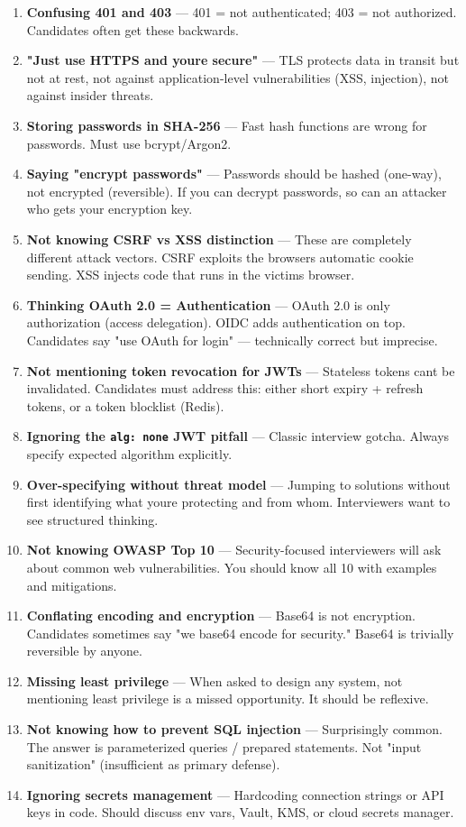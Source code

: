\documentclass[11pt]{article}
\begin{document}
\begin{enumerate}
\def\labelenumi{\arabic{enumi}.}
\item
  \textbf{Confusing 401 and 403} --- 401 = not authenticated; 403 = not authorized. Candidates often get these backwards.
\item
  \textbf{"Just use HTTPS and you\textquotesingle re secure"} --- TLS protects data in transit but not at rest, not against application-level vulnerabilities (XSS, injection), not against insider threats.
\item
  \textbf{Storing passwords in SHA-256} --- Fast hash functions are wrong for passwords. Must use bcrypt/Argon2.
\item
  \textbf{Saying "encrypt passwords"} --- Passwords should be hashed (one-way), not encrypted (reversible). If you can decrypt passwords, so can an attacker who gets your encryption key.
\item
  \textbf{Not knowing CSRF vs XSS distinction} --- These are completely different attack vectors. CSRF exploits the browser\textquotesingle s automatic cookie sending. XSS injects code that runs in the victim\textquotesingle s browser.
\item
  \textbf{Thinking OAuth 2.0 = Authentication} --- OAuth 2.0 is only authorization (access delegation). OIDC adds authentication on top. Candidates say "use OAuth for login" --- technically correct but imprecise.
\item
  \textbf{Not mentioning token revocation for JWTs} --- Stateless tokens can\textquotesingle t be invalidated. Candidates must address this: either short expiry + refresh tokens, or a token blocklist (Redis).
\item
  \textbf{Ignoring the \texttt{alg:\ none} JWT pitfall} --- Classic interview gotcha. Always specify expected algorithm explicitly.
\item
  \textbf{Over-specifying without threat model} --- Jumping to solutions without first identifying what you\textquotesingle re protecting and from whom. Interviewers want to see structured thinking.
\item
  \textbf{Not knowing OWASP Top 10} --- Security-focused interviewers will ask about common web vulnerabilities. You should know all 10 with examples and mitigations.
\item
  \textbf{Conflating encoding and encryption} --- Base64 is not encryption. Candidates sometimes say "we base64 encode for security." Base64 is trivially reversible by anyone.
\item
  \textbf{Missing least privilege} --- When asked to design any system, not mentioning least privilege is a missed opportunity. It should be reflexive.
\item
  \textbf{Not knowing how to prevent SQL injection} --- Surprisingly common. The answer is parameterized queries / prepared statements. Not "input sanitization" (insufficient as primary defense).
\item
  \textbf{Ignoring secrets management} --- Hardcoding connection strings or API keys in code. Should discuss env vars, Vault, KMS, or cloud secrets manager.
\end{enumerate}
\end{document}

